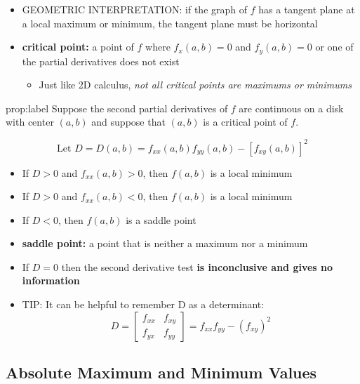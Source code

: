 \documentclass{package/notes}
\begin{document}
\begin{itemize}
	\item GEOMETRIC INTERPRETATION: if the graph of $f$ has a tangent plane at a local maximum or minimum, the tangent plane must be horizontal
	\item \textbf{critical point:} a point of $f$ where $f_x(a,b) = 0$ and $f_y(a,b) = 0$ or one of the partial derivatives does not exist
	\begin{itemize}
		\item Just like 2D calculus, \textit{not all critical points are maximums or minimums}
	\end{itemize}
\end{itemize}

\begin{proposition}{prop:label}
	Suppose the second partial derivatives of $f$ are continuous on a disk with center $(a,b)$ and suppose that $(a,b)$ is a critical point of $f$.
	
	$$\text{Let } D =D(a,b)=f_{xx}(a,b)f_{yy}(a,b)-[f_{xy}(a,b)]^2$$

	\begin{itemize}
		\item If $D > 0$ and $f_{xx}(a,b) > 0$, then $f(a,b)$ is a local minimum
		\item If $D > 0$ and $f_{xx}(a,b) < 0$, then $f(a,b)$ is a local minimum
		\item If $D <0$, then $f(a,b)$ is a saddle point
	\end{itemize}
\end{proposition}

\begin{itemize}
	\item \textbf{saddle point:} a point that is neither a maximum nor a minimum
	\item If $D=0$ then the second derivative test \textbf{is inconclusive and gives no information}
	\item TIP: It can be helpful to remember D as a determinant: 
	$$D = \left[\begin{array}{cc}f_{xx}&f_{xy}\\f_{yx}&f_{yy}\end{array}\right] = f_{xx}f_{yy}-(f_{xy})^2$$
\end{itemize}


\subsection{Absolute Maximum and Minimum Values}
\end{document}
